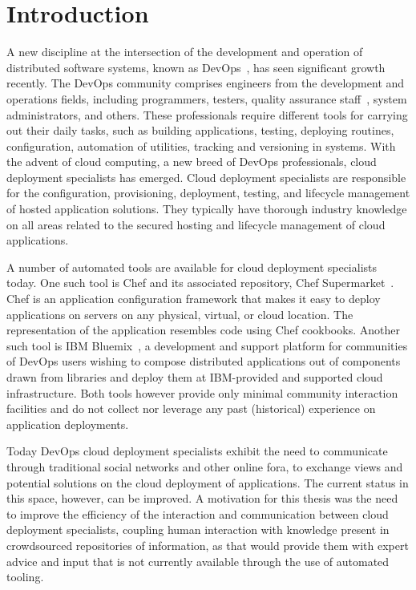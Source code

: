 \chapter{Introduction}
A new discipline at the intersection of the development and operation of distributed software systems, known as DevOps~\cite{loukides2012devops}, has seen significant growth recently.  The DevOps community comprises engineers from the development and operations fields, including programmers, testers, quality assurance staff~\cite{rossberg2014collaboration}, system administrators, and others.  These professionals require different tools for carrying out their daily tasks, such as building applications, testing, deploying routines, configuration, automation of utilities, tracking and versioning in systems.  With the advent of cloud computing, a new breed of DevOps professionals,
cloud deployment specialists has emerged. Cloud deployment specialists are responsible for the configuration, provisioning, deployment, testing, and lifecycle management of hosted application solutions. They typically have thorough industry knowledge on all areas 
related to the secured hosting and lifecycle management of cloud applications.  

A number of automated tools are available for cloud deployment specialists today.  One such tool is Chef and its associated repository, Chef Supermarket~\cite{Chef_base}. Chef is an application configuration framework that makes it easy to deploy applications on servers on any physical, virtual, or cloud location. The representation of the application resembles code using Chef cookbooks. Another such tool is IBM Bluemix~\cite{Bluemix-dev}, a development and support platform for communities of DevOps users wishing to compose distributed applications out of components drawn from libraries and deploy them at IBM-provided and supported cloud infrastructure.  Both tools however provide only minimal community interaction facilities and do not collect nor leverage any past (historical) experience on application deployments.

Today DevOps cloud deployment specialists exhibit the need to communicate through traditional social networks and other online fora, to exchange views and potential solutions on the cloud deployment of applications.  The current status in this space, however, can be improved.  A motivation for this thesis was the need to improve the efficiency of the interaction and communication between cloud deployment specialists, coupling human interaction with knowledge present in crowdsourced repositories of information, as that would provide them with expert advice and input that is not currently available through the use of automated tooling.

